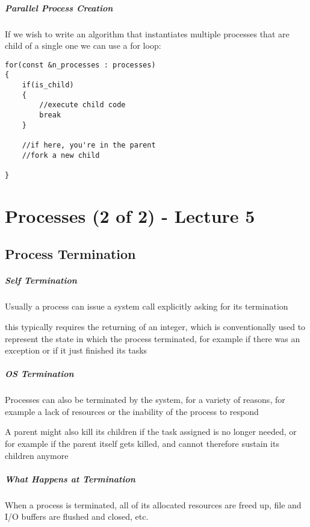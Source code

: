 \documentclass[openright, twoside]{report}
\theoremstyle{definition}
\theoremstyle{example}
\begin{document}
			\paragraph{Parallel Process Creation}
				If we wish to write an algorithm that instantiates multiple processes that 
				are child of a single one
				we can use a for loop:
				\begin{lstlisting}
for(const &n_processes : processes)
{
	if(is_child)
	{
		//execute child code 
		break
	}
	 
	//if here, you're in the parent 
	//fork a new child 

}
				\end{lstlisting}

\chapter{Processes (2 of 2) - Lecture 5}
	\section{Process Termination}
			\label{sec:p_termination}
			\paragraph{Self Termination}
				Usually a process can issue a system call explicitly asking for its 
				termination 

				this typically requires the returning of an integer, which is 
				conventionally used to represent 
				the state in which the process terminated, for example if there was an exception or if it just finished 
				its tasks 

			\paragraph{OS Termination}
				Processes can also be terminated by the system, for a variety of reasons, for example a lack
				of resources or the inability of the process to respond 

				A parent might also kill its children if the task assigned is no longer needed, or for 
				example if the parent itself gets killed, and cannot therefore sustain its children anymore

			\paragraph{What Happens at Termination}
				When a process is terminated, all of its allocated resources are freed up, file 
				and I/O buffers are flushed and closed, etc. 
\end{document}
